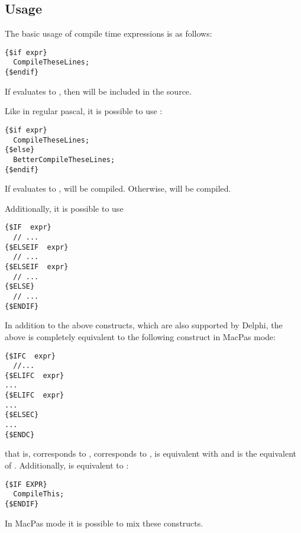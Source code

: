 \subsection{Usage}
The basic usage of compile time expressions is as follows:
\begin{verbatim}
{$if expr}
  CompileTheseLines;
{$endif}
\end{verbatim}
If  evaluates to , then  will be
included in the source.

Like in regular pascal, it is possible to use :
\begin{verbatim}
{$if expr}
  CompileTheseLines;
{$else}
  BetterCompileTheseLines;
{$endif}
\end{verbatim}
If  evaluates to ,  will be
compiled. Otherwise,  will be compiled.

Additionally, it is possible to use 
\begin{verbatim}
{$IF  expr}
  // ...
{$ELSEIF  expr}
  // ...
{$ELSEIF  expr}
  // ...
{$ELSE}
  // ...
{$ENDIF}
\end{verbatim}

In addition to the above constructs, which are also supported by Delphi,
the above is completely equivalent to the following construct in MacPas mode:
\begin{verbatim}
{$IFC  expr}
  //...
{$ELIFC  expr}
...
{$ELIFC  expr}
...
{$ELSEC}
...
{$ENDC}
\end{verbatim}
that is,  corresponds to ,  corresponds to
,  is equivalent with  and  is
the equivalent of . Additionally,  is equivalent to
:
\begin{verbatim}
{$IF EXPR}
  CompileThis;
{$ENDIF}
\end{verbatim}

In MacPas mode it is possible to mix these constructs.


